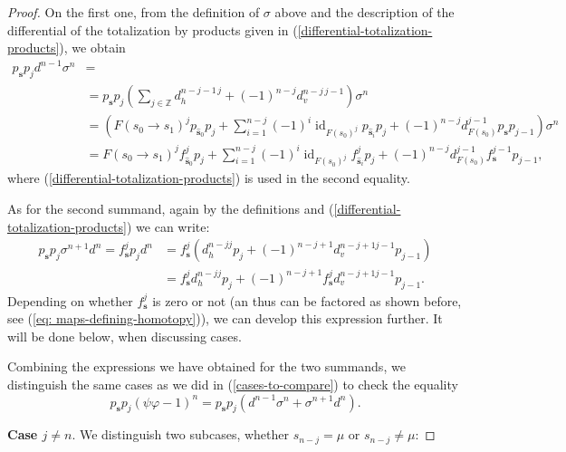 \documentclass[reqno,11pt]{amsart}
\theoremstyle{plain}
\theoremstyle{remark}
\theoremstyle{definition}
\numberwithin{equation}{thm}
\newcommand{\ZZ}{\mathbb{Z}}
\DeclareMathOperator{\id}{id}
\begin{document}
\begin{proof}
		On the first one, from the definition of $\sigma$ above and the description of the differential of the totalization by products given in (\ref{differential-totalization-products}), we obtain
		\small
		\begin{equation}\label{summand-one}
			\begin{aligned}
				p_{\textbf{s}} p_j d^{n-1}\sigma^n &=\\
				&= p_{\textbf{s}} p_j \left(\sum_{j \in \ZZ} d_h^{n-j-1 \, j} + (-1)^{n-j}d_v^{n-j \, j-1}\right) \sigma^n\\
				&=\left(F(s_0 \to s_1)^j p_{\widehat{\textbf{s}}_0} p_j + \sum_{i=1}^{n-j} (-1)^i \id_{F(s_0)^j}p_{\widehat{\textbf{s}}_i} p_j + (-1)^{n-j} d_{F(s_0)}^{j-1} p_{\textbf{s}}p_{j-1}\right) \sigma^n \\
				&= F(s_0 \to s_1)^j f_{\widehat{\textbf{s}}_0}^j p_j + \sum_{i=1}^{n-j} (-1)^i \id_{F(s_0)^j} f_{\widehat{\textbf{s}}_i}^j p_j + (-1)^{n-j} d_{F(s_0)}^{j-1} f_{\textbf{s}}^{j-1} p_{j-1},
			\end{aligned}
		\end{equation} 
		\normalsize
		where (\ref{differential-totalization-products}) is used in the second equality.
		
		As for the second summand, again by the definitions and (\ref{differential-totalization-products}) we can write: 
		\begin{equation}\label{summand-two}
			\begin{aligned}
				 p_{\textbf{s}} p_j \sigma^{n+1}d^n = f_{\textbf{s}}^j p_j d^n &= f_{\textbf{s}}^j \left(d_h^{n-j j} p_j + (-1)^{n-j+1}d_v^{n-j+1 j-1} p_{j-1}\right) \\
				 &=  f_{\textbf{s}}^j d_h^{n-j j} p_j + (-1)^{n-j+1} f_{\textbf{s}}^j d_v^{n-j+1 j-1} p_{j-1}.
			\end{aligned}
		\end{equation}
		Depending on whether $f_{\textbf{s}}^j$ is zero or not (an thus can be factored as shown before, see (\ref{eq: maps-defining-homotopy})), we can develop this expression further. It will be done below, when discussing cases.
		
		Combining the expressions we have obtained for the two summands, we distinguish the same cases as we did in (\ref{cases-to-compare}) to check the equality
		\[
			p_{\textbf{s}}p_j (\psi \varphi - 1)^n = 	p_{\textbf{s}} p_j \left(d^{n-1}\sigma^n + \sigma^{n+1}d^n\right).
		\]
		
		\textbf{Case $j \neq n$}. We distinguish two subcases, whether $s_{n-j} = \mu$ or $s_{n-j}\neq \mu$:
		

\end{proof}
\end{document}
